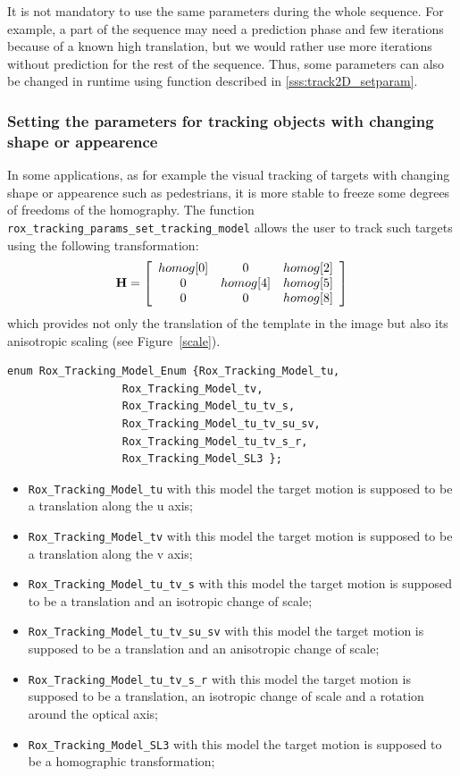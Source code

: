 It is not mandatory to use the same parameters during the whole
sequence. For example, a part of the sequence may need a prediction
phase and few iterations because of a known high translation, but we
would rather use more iterations without prediction for the rest of
the sequence. Thus, some parameters can also be changed in runtime using
function described in \ref{sss:track2D_setparam}.

\subsubsection{Setting the parameters for tracking objects with changing shape or appearence}
\label{sss:tracking_params_examples}

In some applications, as for example the visual tracking of targets
with changing shape or appearence such as pedestrians, it is more
stable to freeze some degrees of freedoms of the homography. The
function
\lstinline$rox_tracking_params_set_tracking_model$ allows the user to
track such targets using the following transformation:
\[
{\bf H} = \left[ \begin{array}{ccc} homog[0] & 0 & homog[2] \\ 0 & homog[4] & homog[5] \\  0 & 0 & homog[8] \end{array} \right]
\]
which provides not only the translation of the template in the image but also its anisotropic scaling (see Figure~\ref{scale}).

\begin{lstlisting}
enum Rox_Tracking_Model_Enum {Rox_Tracking_Model_tu, 
			      Rox_Tracking_Model_tv,
			      Rox_Tracking_Model_tu_tv_s, 
			      Rox_Tracking_Model_tu_tv_su_sv, 
			      Rox_Tracking_Model_tu_tv_s_r, 
			      Rox_Tracking_Model_SL3 };
\end{lstlisting}

\begin{itemize}
\item \lstinline$Rox_Tracking_Model_tu$ with this model the target motion is supposed to be a translation along the u axis;
\item \lstinline$Rox_Tracking_Model_tv$ with this model the target motion is supposed to be a translation along the v axis;
\item \lstinline$Rox_Tracking_Model_tu_tv_s$ with this model the target motion is supposed to be a translation and an isotropic change of scale;
\item \lstinline$Rox_Tracking_Model_tu_tv_su_sv$ with this model the target motion is supposed to be a translation and an anisotropic change of scale;
\item \lstinline$Rox_Tracking_Model_tu_tv_s_r$ with this model the target motion is supposed to be a translation, an isotropic change of scale and a rotation around the optical axis;
\item \lstinline$Rox_Tracking_Model_SL3$ with this model the target motion is supposed to be a homographic transformation;
\end{itemize}

